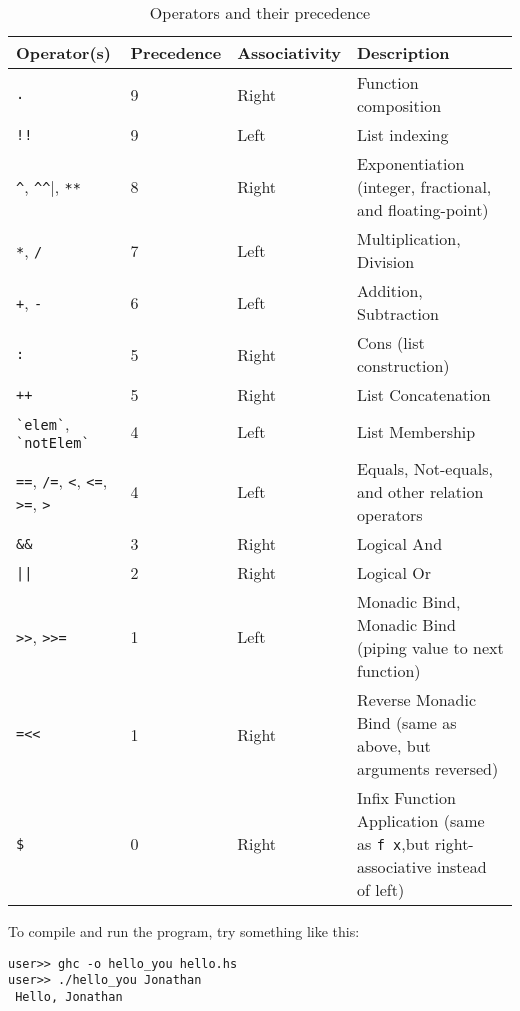 \begin{table}[h]
  \caption{Operators and their precedence}
  \begin{tabular}[c]{| p{2cm} | l | l | p{5cm} |}
	\hline
	\textbf{\small{Operator(s)}} & \textbf{\small{Precedence}} & \textbf{\small{Associativity}} & \textbf{\small{Description}} \\ \hline
 
	\lstinline|.|			& 9 & Right & Function composition \\ \hline
	\lstinline|!!| 			& 9 & Left  & List indexing \\ \hline
	\lstinline|^|, \lstinline|^^|, 
	\lstinline|**| 			& 8 & Right & Exponentiation (integer, fractional, and floating-point) \\ \hline
	\lstinline|*|, \lstinline|/| 	& 7 & Left  & Multiplication, Division \\ \hline
	\lstinline|+|, \lstinline|-| 	& 6 & Left  & Addition, Subtraction \\ \hline
	\lstinline|:| 			& 5 & Right & Cons (list construction) \\ \hline
	\lstinline|++| 			& 5 & Right & List Concatenation \\ \hline
	\lstinline|`elem`|,
	\lstinline|`notElem`| 		& 4 & Left  & List Membership \\ \hline
	\lstinline|==|, \lstinline|/=|, 
	\lstinline|<|, \lstinline|<=|, 
	\lstinline|>=|, \lstinline|>|   & 4 & Left  & Equals, Not-equals, and other relation operators \\ \hline
	\lstinline|&&| 			& 3 & Right & Logical And \\ \hline
	\lstinline!||! 			& 2 & Right & Logical Or \\ \hline
	\lstinline|>>|, \lstinline|>>=| & 1 & Left  & Monadic Bind, Monadic Bind (piping value to next function) \\ \hline
	\lstinline|=<<| 		& 1 & Right & Reverse Monadic Bind (same as above, but arguments reversed) \\ \hline
	\verb|$| 			& 0 & Right & Infix Function Application (same as \verb|f x|,but right-associative instead of left) \\ \hline
 \end{tabular}
\end{table}
 
To compile and run the program, try something like this:
 
\begin{lstlisting}[language=shell,numbers=none,nolol]
user>> ghc -o hello_you hello.hs
user>> ./hello_you Jonathan
 Hello, Jonathan
\end{lstlisting} 
 
